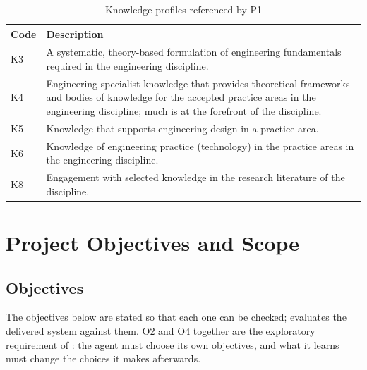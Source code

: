 \begin{table}[htbp]
  \centering
  \caption{Knowledge profiles referenced by P1}
  \label{tab:knowledge-profile}
  \begin{tabularx}{\textwidth}{@{}lY@{}}
    \toprule
    Code & Description \\
    \midrule
    K3 & A systematic, theory-based formulation of engineering fundamentals required in the engineering discipline. \\
    K4 & Engineering specialist knowledge that provides theoretical frameworks and bodies of knowledge for the accepted practice areas in the engineering discipline; much is at the forefront of the discipline. \\
    K5 & Knowledge that supports engineering design in a practice area. \\
    K6 & Knowledge of engineering practice (technology) in the practice areas in the engineering discipline. \\
    K8 & Engagement with selected knowledge in the research literature of the discipline. \\
    \bottomrule
  \end{tabularx}
\end{table}

\section{Project Objectives and Scope}
\label{sec:objectives}

\subsection*{Objectives}

The objectives below are stated so that each one can be checked;
 evaluates the delivered system against them. O2 and O4
together are the exploratory requirement of : the agent must
choose its own objectives, and what it learns must change the choices it makes
afterwards.

